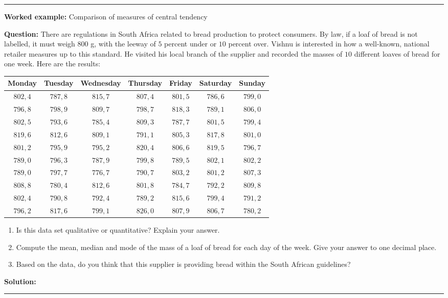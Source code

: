 \documentclass[a4paper,11pt]{report}
\newenvironment{wex}[3]%
{\rule{\linewidth}{0.5mm}
\textbf{Worked example:} #1

\textbf{Question:} #2

\textbf{Solution:} #3}%
{\rule{\linewidth}{0.5mm}}
\begin{document}
\begin{wex}{Comparison of measures of central tendency}{
    There are regulations in South Africa related to bread production
    to protect consumers. By law, if a loaf of bread is not labelled,
    it must weigh $800$ g, with the leeway of $5$ percent under or $10$
    percent over.  Vishnu is interested in how a well-known, national
    retailer measures up to this standard. He visited his local branch
    of the supplier and recorded the masses of $10$ different loaves
    of bread for one week. Here are the results:

    \begin{center}
      \begin{tabular}{ccccccc}
        \toprule
        Monday & Tuesday & Wednesday & Thursday & Friday & Saturday & Sunday \\
        \midrule
        $802,4$ & $787,8$ & $815,7$ & $807,4$ & $801,5$ & $786,6$ & $799,0$ \\
        $796,8$ & $798,9$ & $809,7$ & $798,7$ & $818,3$ & $789,1$ & $806,0$ \\
        $802,5$ & $793,6$ & $785,4$ & $809,3$ & $787,7$ & $801,5$ & $799,4$ \\
        $819,6$ & $812,6$ & $809,1$ & $791,1$ & $805,3$ & $817,8$ & $801,0$ \\
        $801,2$ & $795,9$ & $795,2$ & $820,4$ & $806,6$ & $819,5$ & $796,7$ \\
        $789,0$ & $796,3$ & $787,9$ & $799,8$ & $789,5$ & $802,1$ & $802,2$ \\
        $789,0$ & $797,7$ & $776,7$ & $790,7$ & $803,2$ & $801,2$ & $807,3$ \\
        $808,8$ & $780,4$ & $812,6$ & $801,8$ & $784,7$ & $792,2$ & $809,8$ \\
        $802,4$ & $790,8$ & $792,4$ & $789,2$ & $815,6$ & $799,4$ & $791,2$ \\
        $796,2$ & $817,6$ & $799,1$ & $826,0$ & $807,9$ & $806,7$ & $780,2$ \\
        \bottomrule
      \end{tabular}
    \end{center}

    \begin{enumerate}
    \item Is this data set qualitative or quantitative? Explain your
      answer.
    \item Compute the mean, median and mode of the mass of a loaf of bread
      for each day of the week. Give your answer to one decimal place.
    \item Based on the data, do you think that this supplier is
      providing bread within the South African guidelines?
    \end{enumerate}
}{

}
\end{wex}
\end{document}

